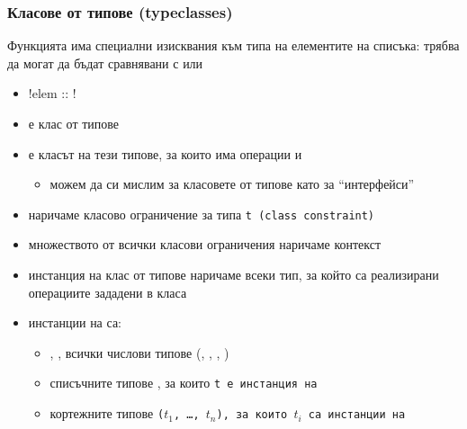 \documentclass[alsotrans]{beamerswitch}
\begin{document}
\begin{frame}[fragile]
  \frametitle{Класове от типове (typeclasses)}

  Функцията  има специални изисквания към типа на елементите на списъка: трябва да могат да бъдат сравнявани с \lst{==} или \lst{/=}
  \begin{itemize}[<+->]
  \item \lst!elem :: !
  \item {} е \alert{клас от типове}
  \item {} е класът на тези типове, за които има операции \lst{==} и \lst{/=}
    \begin{itemize}
    \item можем да си мислим за класовете от типове като за ``интерфейси''
    \end{itemize}
  \item {} наричаме \alert{класово ограничение} за типа \tt t (class constraint)
  \item множеството от всички класови ограничения наричаме \alert{контекст}
  \item \alert{инстанция} на клас от типове наричаме всеки тип, за който са реализирани операциите зададени в класа
  \item инстанции на  са:
    \begin{itemize}
    \item {}, , всички числови типове (, , , )
    \item списъчните типове \lst{[t]}, за които \tt t е инстанция на 
    \item кортежните типове \tt($t_1$\tt, \ldots\tt, $t_n$\tt), за които $t_i$ са инстанции на 
    \end{itemize}
  \end{itemize}
\end{frame}
\end{document}
